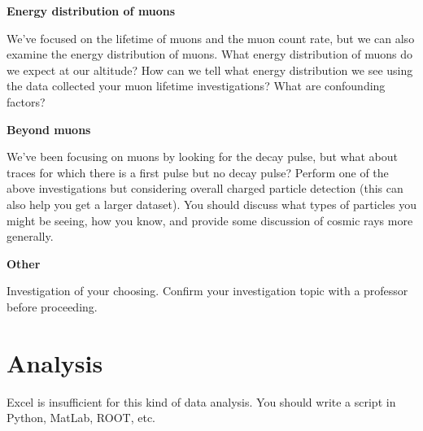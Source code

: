 \documentclass{../lab}
\begin{document}
\textbf{Energy distribution of muons}

We've focused on the lifetime of muons and the muon count rate, but we can also examine the energy distribution of muons. What energy distribution of muons do we expect at our altitude? How can we tell what energy distribution we see using the data collected your muon lifetime investigations? What are confounding factors?

\textbf{Beyond muons}

We've been focusing on muons by looking for the decay pulse, but what about traces for which there is a first pulse but no decay pulse? Perform one of the above investigations but considering overall charged particle detection (this can also help you get a larger dataset). You should discuss what types of particles you might be seeing, how you know, and provide some discussion of cosmic rays more generally.


\textbf{Other}

Investigation of your choosing. Confirm your investigation topic with a professor before proceeding.


\section{Analysis}
Excel is insufficient for this kind of data analysis. You should write a script in Python, MatLab, ROOT, etc.
\end{document}
